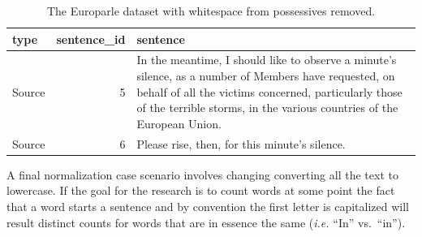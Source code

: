 \documentclass[
  letterpaper,
]{latex/krantz}
\begin{document}
\hypertarget{tbl-normalize-whitespace-remove-europarle}{}
\begin{table}
\caption{\label{tbl-normalize-whitespace-remove-europarle}The Europarle dataset with whitespace from possessives removed. }\tabularnewline

\centering
\begin{tabular}{lrl}
\toprule
type & sentence\_id & sentence\\
\midrule
Source & 5 & In the meantime, I should like to observe a minute's silence, as a number of Members have requested, on behalf of all the victims concerned, particularly those of the terrible storms, in the various countries of the European Union.\\
Source & 6 & Please rise, then, for this minute's silence.\\
\bottomrule
\end{tabular}
\end{table}

A final normalization case scenario involves changing converting all the
text to lowercase. If the goal for the research is to count words at
some point the fact that a word starts a sentence and by convention the
first letter is capitalized will result distinct counts for words that
are in essence the same (\emph{i.e.} ``In'' vs.~``in'').
\end{document}
